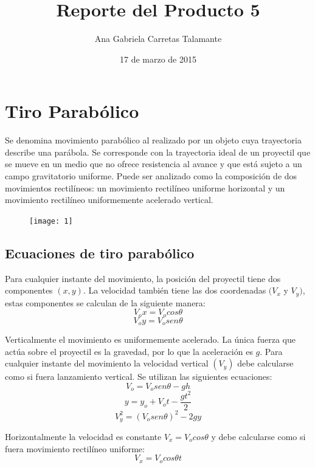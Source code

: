 \documentclass[a4paper]{article}
\title{Reporte del Producto 5}
\author{Ana Gabriela Carretas Talamante}
\date{17 de marzo de 2015}
\begin{document}
\maketitle
\section{Tiro Parabólico}
Se denomina movimiento parabólico al realizado por un objeto cuya trayectoria describe una parábola. Se corresponde con la trayectoria ideal de un proyectil que se mueve en un medio que no ofrece resistencia al avance y que está sujeto a un campo gravitatorio uniforme. Puede ser analizado como la composición de dos movimientos rectilíneos: un movimiento rectilíneo uniforme horizontal y un movimiento rectilíneo uniformemente acelerado vertical. 
\begin{figure}[H]
    \centering
    \texttt{[image: 1]}
  \end{figure} 
  
\subsection{Ecuaciones de tiro parabólico}
\label{uno}

Para cualquier instante del movimiento, la posición del proyectil tiene dos componentes $(x,y)$. La velocidad también tiene las dos coordenadas $(V_x$ y $V_y)$, estas componentes se calculan de la siguiente manera:
\begin{equation} 
\label{1}
V_ox=V_ocos\theta
\end{equation}
\label{2}
\begin{equation}
V_oy=V_osen\theta
\end{equation}

Verticalmente el movimiento es uniformemente acelerado. La única fuerza que actúa sobre el proyectil es la gravedad, por lo que la aceleración es $g$. Para cualquier instante del movimiento la velocidad vertical $(V_y)$ debe calcularse como si fuera lanzamiento vertical. Se utilizan las siguientes ecuaciones:
\begin{equation}
\label{3}
V_o=V_osen\theta-gh
\end{equation}
\begin{equation}
\label{4}
y=y_o+V_ot-\frac{gt^2}{2}
\end{equation}
\begin{equation}
\label{5}
V_y^2=(V_osen\theta)^2-2gy
\end{equation}

Horizontalmente la velocidad es constante $V_x=V_ocos\theta$ y debe calcularse como si fuera movimiento rectilíneo uniforme:
\begin{equation}
\label{6}
V_x=V_ocos\theta t
\end{equation}
\end{document}
